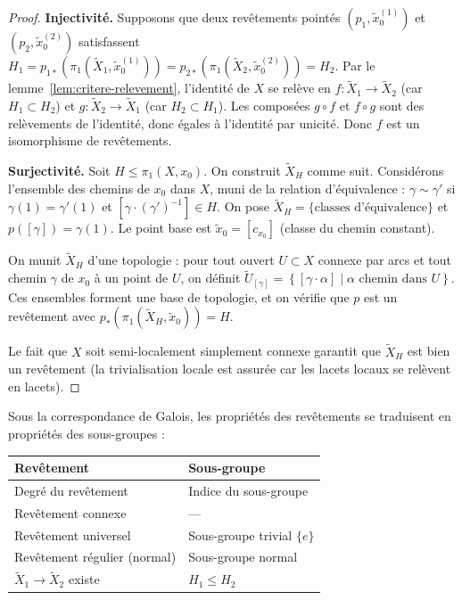\documentclass[12pt,a4paper,openany]{book}
\theoremstyle{definition}
\theoremstyle{plain}
\theoremstyle{remark}
\newcommand{\set}[1]{\left\{#1\right\}}
\begin{document}
\begin{proof}
\textbf{Injectivité.} Supposons que deux revêtements pointés
$(p_1, \tilde{x}_0^{(1)})$ et $(p_2, \tilde{x}_0^{(2)})$ satisfassent
$H_1 = p_{1*}(\pi_1(\widetilde{X}_1, \tilde{x}_0^{(1)})) = p_{2*}(\pi_1(\widetilde{X}_2, \tilde{x}_0^{(2)})) = H_2$.
Par le lemme~\ref{lem:critere-relevement}, l'identité de $X$ se relève en
$f \colon \widetilde{X}_1 \to \widetilde{X}_2$ (car $H_1 \subset H_2$) et
$g \colon \widetilde{X}_2 \to \widetilde{X}_1$ (car $H_2 \subset H_1$).
Les composées $g \circ f$ et $f \circ g$ sont des relèvements de l'identité, donc
égales à l'identité par unicité. Donc $f$ est un isomorphisme de revêtements.

\textbf{Surjectivité.} Soit $H \leq \pi_1(X, x_0)$. On construit
$\widetilde{X}_H$ comme suit. Considérons l'ensemble des chemins de $x_0$ dans $X$,
muni de la relation d'équivalence : $\gamma \sim \gamma'$ si $\gamma(1) = \gamma'(1)$ et
$[\gamma \cdot (\gamma')^{-1}] \in H$. On pose $\widetilde{X}_H = \{\text{classes d'équivalence}\}$
et $p([\gamma]) = \gamma(1)$. Le point base est $\tilde{x}_0 = [c_{x_0}]$ (classe du chemin constant).

On munit $\widetilde{X}_H$ d'une topologie : pour tout ouvert $U \subset X$ connexe par arcs
et tout chemin $\gamma$ de $x_0$ à un point de $U$, on définit
$\widetilde{U}_{[\gamma]} = \set{[\gamma \cdot \alpha] \mid \alpha \text{ chemin dans } U}$.
Ces ensembles forment une base de topologie, et on vérifie que $p$ est un revêtement
avec $p_*(\pi_1(\widetilde{X}_H, \tilde{x}_0)) = H$.

Le fait que $X$ soit semi-localement simplement connexe garantit que $\widetilde{X}_H$
est bien un revêtement (la trivialisation locale est assurée car les lacets locaux se
relèvent en lacets).
\end{proof}

Sous la correspondance de Galois, les propriétés des revêtements se traduisent en propriétés
des sous-groupes :

\begin{center}
\renewcommand{\arraystretch}{1.4}
\begin{tabular}{ll}
\toprule
\textbf{Revêtement} & \textbf{Sous-groupe} \\
\midrule
Degré du revêtement & Indice du sous-groupe \\
Revêtement connexe & --- \\
Revêtement universel & Sous-groupe trivial $\{e\}$ \\
Revêtement régulier (normal) & Sous-groupe normal \\
$\widetilde{X}_1 \to \widetilde{X}_2$ existe & $H_1 \leq H_2$ \\
\bottomrule
\end{tabular}
\end{center}
\end{document}
